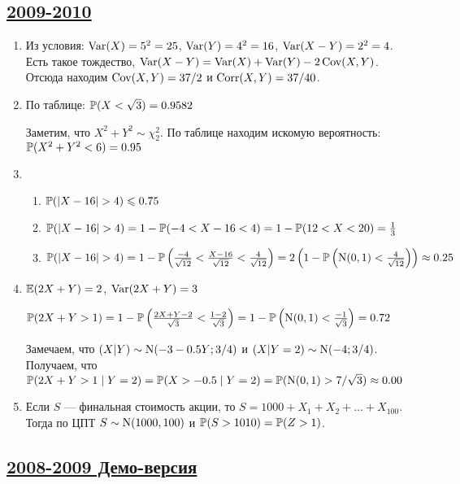 \subsection[2009-2010]{\hyperref[sec:kr_01_2009_2010]{2009-2010}}
\label{sec:sol_kr_01_2009_2010}

\begin{enumerate}
\item Из условия: $\Var(X) = 5^2 = 25$, $\Var(Y) = 4^2 = 16$, $\Var(X - Y) = 2^2 = 4$.
Есть такое тождество, $\Var(X - Y) = \Var(X) + \Var(Y) - 2\Cov(X,Y)$. Отсюда находим
$\Cov(X, Y) = 37/2$ и $\Corr(X, Y) = 37/40$.
\item По таблице: $\P(X<\sqrt{3}) = 0.9582$

Заметим, что $X^2 + Y^2 \sim \chi^2_2$. По таблице находим искомую вероятность:
$\P(X^2 + Y^2<6) = 0.95$
\item
\begin{enumerate}
\item $\P(|X - 16| > 4) \leq 0.75$
\item $\P(|X - 16| > 4) = 1 - \P(-4 < X-16 < 4) = 1 - \P(12 < X < 20) = \frac{1}{3}$
\item $\P(|X - 16| > 4) =  1 - \P\left(\frac{-4}{\sqrt{12}} < \frac{X-16}{\sqrt{12}}
< \frac{4}{\sqrt{12}}\right) = 2 \left(1 - \P\left(\cN(0, 1)<\frac{4}{\sqrt{12}}\right)\right) \approx 0.25$
\end{enumerate}
\item $\E(2X + Y) = 2$, $\Var(2X + Y) = 3$

$\P(2X+Y>1) = 1 - \P\left(\frac{2X+Y - 2}{\sqrt{3}} < \frac{1-2}{\sqrt{3}}\right) =
1 - \P\left(\cN(0,1) < \frac{-1}{\sqrt{3}}\right)= 0.72$

Замечаем, что $(X|Y)\sim \cN(-3 - 0.5Y; 3/4)$ и $(X|Y=2)\sim \cN(-4;3/4)$.
Получаем, что 
$\P(2X+Y>1 \mid Y=2) = \P(X>-0.5 \mid Y=2) = 
\P(\cN(0,1) > 7/\sqrt{3}) \approx 0.00$

\item Если $S$ — финальная стоимость акции, то $S = 1000 + X_1 + X_2 + \ldots + X_{100}$.
Тогда по ЦПТ $S\sim \cN(1000,100)$ и $\P(S > 1010) = \P(Z > 1)$.
\end{enumerate}



\subsection[2008-2009 Демо-версия]{\hyperref[sec:kr_02_2008_2009_demo]{2008-2009 Демо-версия}}
\label{sec:sol_kr_02_2008_2009_demo}

